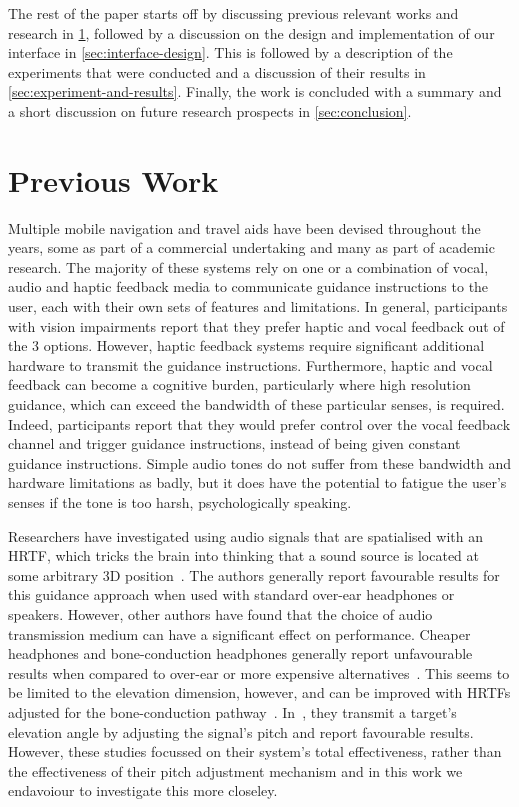 \documentclass{llncs}
\begin{document}
The rest of the paper starts off by discussing previous relevant works and research in \cref{sec:prev-work}, followed by a discussion on the design and implementation of our interface in \cref{sec:interface-design}.
This is followed by a description of the experiments that were conducted and a discussion of their results in \cref{sec:experiment-and-results}.
Finally, the work is concluded with a summary and a short discussion on future research prospects in \cref{sec:conclusion}.

\section{Previous Work}\label{sec:prev-work}

Multiple mobile navigation and travel aids have been devised throughout the years, some as part of a commercial undertaking and many as part of academic research.
The majority of these systems rely on one or a combination of vocal, audio and haptic feedback media to communicate guidance instructions to the user, each with their own sets of features and limitations.
In general, participants with vision impairments report that they prefer haptic and vocal feedback out of the 3 options. 
However, haptic feedback systems require significant additional hardware to transmit the guidance instructions.
Furthermore, haptic and vocal feedback can become a cognitive burden, particularly where high resolution guidance, which can exceed the bandwidth of these particular senses, is required.
Indeed, participants report that they would prefer control over the vocal feedback channel and trigger guidance instructions, instead of being given constant guidance instructions. 
Simple audio tones do not suffer from these bandwidth and hardware limitations as badly, but it does have the potential to fatigue the user's senses if the tone is too harsh, psychologically speaking.

Researchers have investigated using audio signals that are spatialised with an HRTF, which tricks the brain into thinking that a sound source is located at some arbitrary 3D position~\cite{geronazzo2016interactive,wilson2007swan,katz2010navig,blum2013spatialized}.
The authors generally report favourable results for this guidance approach when used with standard over-ear headphones or speakers. 
However, other authors have found that the choice of audio transmission medium can have a significant effect on performance.
Cheaper headphones and bone-conduction headphones generally report unfavourable results when compared to over-ear or more expensive alternatives~\cite{schonstein2008comparison,macdonald2006spatial,stanley2006lateralization}. 
This seems to be limited to the elevation dimension, however, and can be improved with HRTFs adjusted for the bone-conduction pathway~\cite{stanley2006lateralization}.
In~\cite{durette2008visuo}, they transmit a target's elevation angle by adjusting the signal's pitch and report favourable results. 
However, these studies focussed on their system's total effectiveness, rather than the effectiveness of their pitch adjustment mechanism and in this work we endavoiour to investigate this more closeley. 
\end{document}
